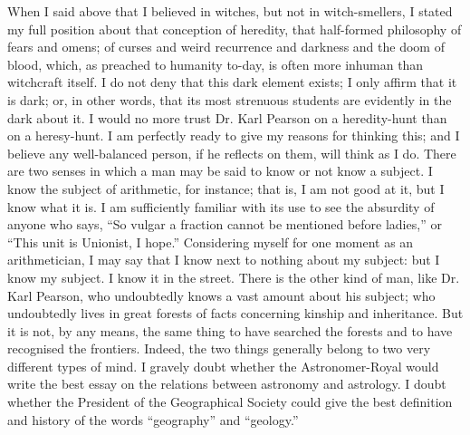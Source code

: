 \documentclass{book}
\begin{document}
When I said above that I believed in witches, but not in witch-smellers, I stated my full position about that conception of heredity, that half-formed philosophy of fears and omens; of curses and weird recurrence and darkness and the doom of blood, which, as preached to humanity to-day, is often more inhuman than witchcraft itself. I do not deny that this dark element exists; I only affirm that it is dark; or, in other words, that its most strenuous students are evidently in the dark about it. I would no more trust Dr. Karl Pearson on a heredity-hunt than on a heresy-hunt. I am perfectly ready to give my reasons for thinking this; and I believe any well-balanced person, if he reflects on them, will think as I do. There are two senses in which a man may be said to know or not know a subject. I know the subject of arithmetic, for instance; that is, I am not good at it, but I know what it is. I am sufficiently familiar with its use to see the absurdity of anyone who says, “So vulgar a fraction cannot be mentioned before ladies,” or “This unit is Unionist, I hope.” Considering myself for one moment as an arithmetician, I may say that I know next to nothing about my subject: but I know my subject. I know it in the street. There is the other kind of man, like Dr. Karl Pearson, who undoubtedly knows a vast amount about his subject; who undoubtedly lives in great forests of facts concerning kinship and inheritance. But it is not, by any means, the same thing to have searched the forests and to have recognised the frontiers. Indeed, the two things generally belong to two very different types of mind. I gravely doubt whether the Astronomer-Royal would write the best essay on the relations between astronomy and astrology. I doubt whether the President of the Geographical Society could give the best definition and history of the words “geography” and “geology.”
\end{document}
